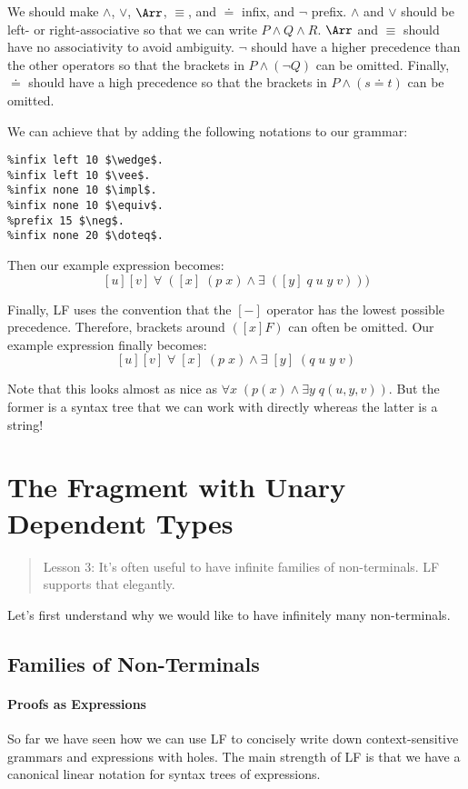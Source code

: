 We should make $\wedge$, $\vee$, $\impl$, $\equiv$, and $\doteq$ infix, and $\neg$ prefix.
$\wedge$ and $\vee$ should be left- or right-associative so that we can write $P\wedge Q\wedge R$. $\impl$ and $\equiv$ should have no associativity to avoid ambiguity.
$\neg$ should have a higher precedence than the other operators so that the brackets in $P\wedge (\neg Q)$ can be omitted. Finally, $\doteq$ should have a high precedence so that the brackets in $P\wedge (s\doteq t)$ can be omitted.

We can achieve that by adding the following notations to our grammar:

\begin{lstlisting}
%infix left 10 $\wedge$.
%infix left 10 $\vee$.
%infix none 10 $\impl$.
%infix none 10 $\equiv$.
%prefix 15 $\neg$.
%infix none 20 $\doteq$.
\end{lstlisting}

Then our example expression becomes:
\[[u][v]\;\forall\;([x]\;(p\;x)\wedge\exists\;([y]\;q\;u\;y\;v)))\]

Finally, LF uses the convention that the $[-]$ operator has the lowest possible precedence. Therefore, brackets around $([x]F)$ can often be omitted.
Our example expression finally becomes:
\[[u][v]\;\forall\;[x]\;(p\;x)\wedge\exists\;[y]\;(q\;u\;y\;v)\]

Note that this looks almost as nice as $\forall x\;(p(x) \wedge \exists y\;q(u,y,v))$. But the former is a syntax tree that we can work with directly whereas the latter is a string!


\section{The Fragment with Unary Dependent Types}

\begin{quote}
Lesson 3: It's often useful to have infinite families of non-terminals. LF supports that elegantly.
\end{quote}

Let's first understand why we would like to have infinitely many non-terminals.

\subsection{Families of Non-Terminals}

\paragraph{Proofs as Expressions}
So far we have seen how we can use LF to concisely write down context-sensitive grammars and expressions with holes. The main strength of LF is that we have a canonical linear notation for syntax trees of expressions.

